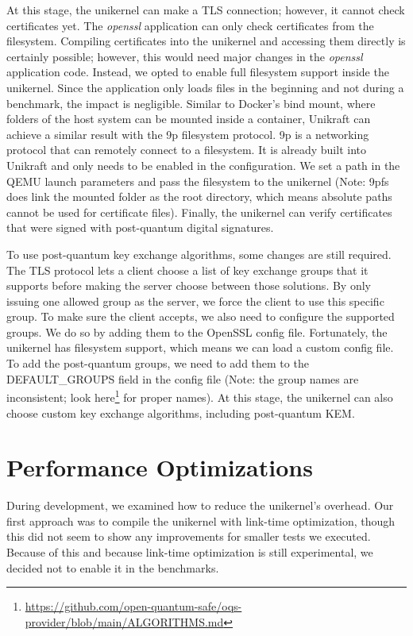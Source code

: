 \documentclass[public,noindent]{aisecreport}
\begin{document}
At this stage, the unikernel can make a TLS connection; however, it cannot check certificates yet. The \textit{openssl} application can only check certificates from the filesystem. Compiling certificates into the unikernel and accessing them directly is certainly possible; however, this would need major changes in the \textit{openssl} application code. Instead, we opted to enable full filesystem support inside the unikernel. Since the application only loads files in the beginning and not during a benchmark, the impact is negligible. Similar to Docker's bind mount, where folders of the host system can be mounted inside a container, Unikraft can achieve a similar result with the 9p filesystem protocol. 9p is a networking protocol that can remotely connect to a filesystem. It is already built into Unikraft and only needs to be enabled in the configuration. We set a path in the QEMU launch parameters and pass the filesystem to the unikernel (Note: 9pfs does link the mounted folder as the root directory, which means absolute paths cannot be used for certificate files). Finally, the unikernel can verify certificates that were signed with post-quantum digital signatures. 

To use post-quantum key exchange algorithms, some changes are still required. The TLS protocol lets a client choose a list of key exchange groups that it supports before making the server choose between those solutions. By only issuing one allowed group as the server, we force the client to use this specific group. To make sure the client accepts, we also need to configure the supported groups. We do so by adding them to the OpenSSL config file. Fortunately, the unikernel has filesystem support, which means we can load a custom config file. To add the post-quantum groups, we need to add them to the DEFAULT\_GROUPS field in the config file (Note: the group names are inconsistent; look here\footnote{\url{https://github.com/open-quantum-safe/oqs-provider/blob/main/ALGORITHMS.md}} for proper names). At this stage, the unikernel can also choose custom key exchange algorithms, including post-quantum KEM.

\section{Performance Optimizations}

During development, we examined how to reduce the unikernel's overhead. Our first approach was to compile the unikernel with link-time optimization, though this did not seem to show any improvements for smaller tests we executed. Because of this and because link-time optimization is still experimental, we decided not to enable it in the benchmarks. 
\end{document}
